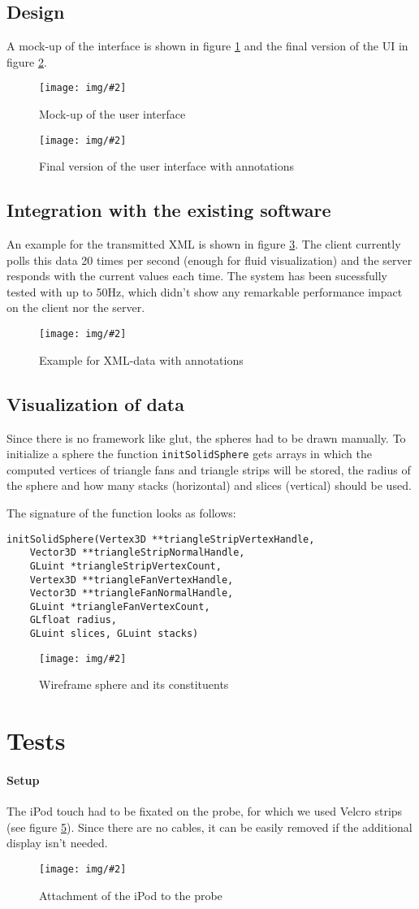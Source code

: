 \documentclass{scrartcl}
\newcommand{\graphic}[3][width=\linewidth] %
{
  \begin{figure}[h!t]
    \centering
    \texttt{[image: img/\#2]}
    \caption{#3}
    \label{fig:#2}
  \end{figure}
}
\newcommand{\refFigure}[1]{figure \ref{fig:#1}}
\begin{document}
\subsection{Design}
A mock-up of the interface is shown in \refFigure{mockup} and the final version of the UI in \refFigure{screen-annotated}.
\graphic[scale=.5]{mockup}{Mock-up of the user interface}
\graphic[scale=.5]{screen-annotated}{Final version of the user interface with annotations}


\subsection{Integration with the existing software}
An example for the transmitted XML is shown in \refFigure{data}. The client currently polls this data 20 times per second (enough for fluid visualization) and the server responds with the current values each time. The system has been sucessfully tested with up to 50Hz, which didn't show any remarkable performance impact on the client nor the server.
\graphic[scale=.5]{data}{Example for XML-data with annotations}

\subsection{Visualization of data}
Since there is no framework like glut, the spheres had to be drawn manually. To initialize a sphere the function \verb|initSolidSphere| gets arrays in which the computed vertices of triangle fans and triangle strips will be stored, the radius of the sphere and how many stacks (horizontal) and slices (vertical) should be used.

The signature of the function looks as follows:
\begin{verbatim}
initSolidSphere(Vertex3D **triangleStripVertexHandle,
    Vector3D **triangleStripNormalHandle,
    GLuint *triangleStripVertexCount,
    Vertex3D **triangleFanVertexHandle,
    Vector3D **triangleFanNormalHandle,
    GLuint *triangleFanVertexCount,
    GLfloat radius,
    GLuint slices, GLuint stacks)
\end{verbatim}
\graphic[scale=.5]{sphere}{Wireframe sphere and its constituents}



\section{Tests}
\paragraph*{Setup}
The iPod touch had to be fixated on the probe, for which we used Velcro strips (see \refFigure{probe}). Since there are no cables, it can be easily removed if the additional display isn't needed.
\graphic[scale=.5]{probe}{Attachment of the iPod to the probe}
\end{document}
